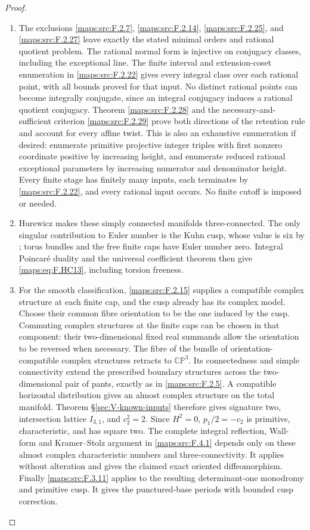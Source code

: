 \begin{proof}
\begin{enumerate}[label={$\langle1\rangle$\arabic*.}]
\item The exclusions \ref{maps:src:F.2.7}, \ref{maps:src:F.2.14}, \ref{maps:src:F.2.25}, and \ref{maps:src:F.2.27}
leave exactly the stated minimal orders and rational
quotient problem.
The rational normal form is injective on conjugacy
classes, including the exceptional line.
The finite interval and extension-coset enumeration
in \ref{maps:src:F.2.22} gives every integral class over each rational
point, with all bounds proved for that input.
No distinct rational points can become integrally
conjugate, since an integral conjugacy induces a
rational quotient conjugacy.
Theorem \ref{maps:src:F.2.28} and the necessary-and-sufficient
criterion \ref{maps:src:F.2.29} prove both directions of the
retention rule and account for every affine twist.
This is also an exhaustive enumeration if desired:
enumerate primitive projective integer triples with
first nonzero coordinate positive by increasing height,
and enumerate reduced rational exceptional parameters
by increasing numerator and denominator height.
Every finite stage has finitely many inputs, each
terminates by \ref{maps:src:F.2.22}, and every rational input occurs.
No finite cutoff is imposed or needed.

\item Hurewicz makes these simply connected manifolds three-connected.  The only singular contribution to
Euler number is the Kuhn cusp, whose value is six
by ; torus bundles and the free finite caps have
Euler number zero.
Integral Poincar\'e duality and the universal coefficient
theorem then give \eqref{maps:eq:F.HC13}, including torsion freeness.

\item For the smooth classification, \ref{maps:src:F.2.15} supplies a
compatible complex structure at each finite cap, and
the cusp already has its complex model.
Choose their common fibre orientation to be the one
induced by the cusp.
Commuting complex structures at the finite caps can
be chosen in that component: their two-dimensional
fixed real summands allow the orientation to be
reversed when necessary.
The fibre of the bundle of orientation-compatible
complex structures retracts to $\mathbb{CP}^3$.
Its connectedness and simple connectivity extend
the prescribed boundary structures across the
two-dimensional pair of pants, exactly as in \ref{maps:src:F.2.5}.
A compatible horizontal distribution gives an
almost complex structure on the total manifold.
Theorem \S\ref{sec:V-known-inputs} therefore gives signature two,
intersection lattice $I_{3,1}$, and $c_2^2=2$.
Since $H^2=0$, $p_1/2=-c_2$ is primitive,
characteristic, and has square two.
The complete integral reflection, Wall-form and Kramer--Stolz argument in \ref{maps:src:F.4.1}
depends only on these almost complex characteristic
numbers and three-connectivity.
It applies without alteration and gives the claimed
exact oriented diffeomorphism.
Finally \ref{maps:src:F.3.11} applies to the resulting determinant-one
monodromy and primitive cusp.
It gives the punctured-base periods with bounded cusp correction.


\end{enumerate}
\end{proof}
